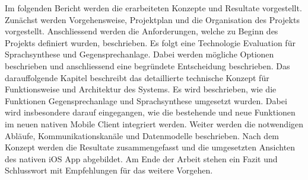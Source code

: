 Im folgenden Bericht werden die erarbeiteten Konzepte und Resultate vorgestellt.
Zunächst werden Vorgehensweise, Projektplan und die Organisation des Projekts vorgestellt.
Anschliessend werden die Anforderungen, welche zu Beginn des Projekts definiert wurden, beschrieben.
Es folgt eine Technologie Evaluation für Sprachsynthese und Gegensprechanlage.
Dabei werden mögliche Optionen beschrieben und anschliessend eine begründete Entscheidung beschrieben.
Das darauffolgende Kapitel beschreibt das detaillierte technische Konzept für Funktionsweise und Architektur des Systems.
Es wird beschrieben, wie die Funktionen Gegensprechanlage und Sprachsynthese umgesetzt wurden.
Dabei wird insbesondere darauf eingegangen, wie die bestehende und neue Funktionen im neuen nativen Mobile Client integriert werden.
Weiter werden die notwendigen Abläufe, Kommunikationskanäle und Datenmodelle beschrieben.
Nach dem Konzept werden die Resultate zusammengefasst und die umgesetzten Ansichten des nativen iOS App abgebildet.
Am Ende der Arbeit stehen ein Fazit und Schlusswort mit Empfehlungen für das weitere Vorgehen.

\clearpage
